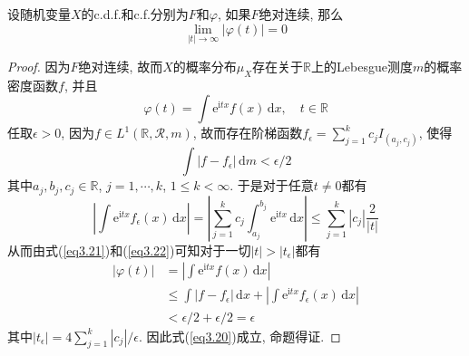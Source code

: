 \documentclass[cn, 12pt, math=mtpro2, bibstyle=apa, blue, twocol]{elegantbook}
\newcommand{\R}{\mathbb{R}}
\begin{document}
\begin{theorem}
设随机变量$X$的c.d.f.和c.f.分别为$F$和$\varphi$, 如果$F$绝对连续, 那么
\begin{equation}\label{eq3.20}
  \lim_{|t|\to\infty}|\varphi(t)|=0
\end{equation}
\end{theorem}
\begin{proof}
  因为$F$绝对连续, 故而$X$的概率分布$\mu_X$存在关于$\R$上的Lebesgue测度$m$的概率密度函数$f$, 并且
  $$\varphi(t)=\int \text{e}^{\text{i}tx}f(x)\,\text{d}x,\quad t\in\R$$
  任取$\epsilon>0$, 因为$f\in L^1(\R,\mathcal{R},m)$, 故而存在阶梯函数$f_\epsilon=\sum_{j=1}^{k}c_jI_{(a_j,c_j)}$, 使得
  \begin{equation}\label{eq3.21}
    \int|f-f_\epsilon|\,\text{d}m<\epsilon/2
  \end{equation}
  其中$a_j, b_j, c_j\in\R$, $j=1,\cdots,k$, $1\leq k<\infty$. 于是对于任意$t\ne0$都有
  \begin{equation}\label{eq3.22}
    \left|\int\text{e}^{\text{i}tx}f_\epsilon(x)\,\text{d}x\right|=\left|\sum_{j=1}^{k}c_j\int_{a_j}^{b_j}\text{e}^{\text{i}tx}\,\text{d}x\right|\leq\sum_{j=1}^{k}|c_j|\frac{2}{|t|}
  \end{equation}
  从而由式(\ref{eq3.21})和(\ref{eq3.22})可知对于一切$|t|>|t_\epsilon|$都有
  \begin{align*}
  |\varphi(t)|&=\left|\int\text{e}^{\text{i}tx}f(x)\,\text{d}x\right| \\
  &\leq\int|f-f_\epsilon|\,\text{d}x+\left|\int \text{e}^{\text{i}tx}f_\epsilon(x)\,\text{d}x\right| \\
  &<\epsilon/2+\epsilon/2=\epsilon
  \end{align*}
  其中$|t_\epsilon|=4\sum_{j=1}^{k}|c_j|/\epsilon$. 因此式(\ref{eq3.20})成立, 命题得证.
\end{proof}
\end{document}
